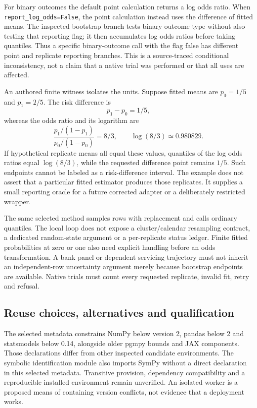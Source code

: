 For binary outcomes the default point calculation returns a log odds
ratio. When \texttt{report\_log\_odds=False}, the point calculation instead
uses the difference of fitted means. The inspected bootstrap branch tests
binary outcome type without also testing that reporting flag; it then
accumulates log odds ratios before taking quantiles. Thus a specific
binary-outcome call with the flag false has different point and replicate
reporting branches. This is a source-traced conditional inconsistency,
not a claim that a native trial was performed or that all uses are affected.
\citep{exec24_ananke_source}

An authored finite witness isolates the units. Suppose fitted means are
$p_0=1/5$ and $p_1=2/5$. The risk difference is
\[
 p_1-p_0=1/5,
\]
whereas the odds ratio and its logarithm are
\[
 \frac{p_1/(1-p_1)}{p_0/(1-p_0)}=8/3,
 \qquad \log(8/3)\simeq0.980829.
\]
If hypothetical replicate means all equal these values, quantiles of
the log odds ratios equal $\log(8/3)$, while the requested difference
point remains $1/5$. Such endpoints cannot be labeled as a risk-difference
interval. The example does not assert that a particular fitted estimator
produces those replicates. It supplies a small reporting oracle for a
future corrected adapter or a deliberately restricted wrapper.
\citep{exec24_ananke_choice}

The same selected method samples rows with replacement and calls ordinary
quantiles. The local loop does not expose a cluster/calendar resampling
contract, a dedicated random-state argument or a per-replicate status
ledger. Finite fitted probabilities at zero or one also need explicit
handling before an odds transformation. A bank panel or dependent servicing
trajectory must not inherit an independent-row uncertainty argument merely
because bootstrap endpoints are available. Native trials must count every
requested replicate, invalid fit, retry and refusal.
\citep{exec24_ananke_source,exec24_ananke_choice}

\subsection{Reuse choices, alternatives and qualification}
The selected metadata constrains NumPy below version 2, pandas below 2 and
statsmodels below 0.14, alongside older pgmpy bounds and JAX components.
Those declarations differ from other inspected candidate environments.
The symbolic identification module also imports SymPy without a direct
declaration in this selected metadata. Transitive provision, dependency
compatibility and a reproducible installed environment remain unverified.
An isolated worker is a proposed means of containing version conflicts,
not evidence that a deployment works.~\citep{exec24_ananke_source}

